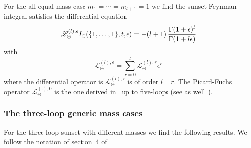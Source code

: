 \documentclass[a4paper,12pt]{article}
\numberwithin{equation}{section}
\numberwithin{figure}{subsection}
\theoremstyle{plain}
\theoremstyle{plain}
\theoremstyle{definition}
\theoremstyle{plain}
\theoremstyle{remark}
\theoremstyle{plain}
\def\su{\circleddash}
\begin{document}
   
For the all equal mass case $m_1=\cdots =m_{l+1}=1$ we find the sunset
Feynman integral satisfies the differential equation
\begin{equation}
  \mathscr{L}_\su^{(l),\epsilon} I_\su(\{1,\dots,1\},t,\epsilon)=
  -(l+1)! {\Gamma(1+\epsilon)^l\over \Gamma(1+l\epsilon)}
\end{equation}
with
\begin{equation}
  \mathscr{L}_\su^{(l),\epsilon} =\sum_{r=0}^{l}  \mathscr{L}_\su^{(l),r} \epsilon^r
\end{equation}
where the differential operator is $ \mathscr{L}_\su^{(l),r}$ is of
order $l-r$. The Picard-Fuchs operator $ \mathscr{L}_\su^{(l),0}$ is
the one derived in~\cite{Vanhove:2014wqa} up to five-loops (see as well~\cite{Bonisch:2020qmm,Pogel:2022yat,Pogel:2022ken,Pogel:2022vat}).


\subsubsection{The three-loop generic mass cases}\label{sec:threeloop}

For the three-loop sunset with different masses we find the following
results. We follow the notation of section~4 of~\cite{Lairez:2022zkj}
\end{document}
